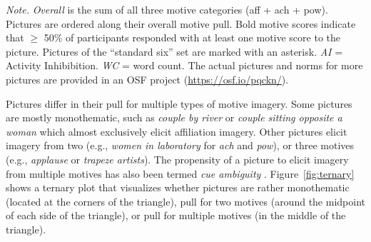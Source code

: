 \documentclass[man,a4paper,mask]{apa6}\usepackage[]{graphicx}\usepackage[]{color}
\begin{document}
\begin{table}
\begin{threeparttable}
\begin{tabularx}{\textwidth}{rlllllllr}
		
		\bottomrule
		\end{tabularx}
		\begin{tablenotes}[para,flushleft]
			{\small
			\vspace*{0.75em}
			\textit{Note.} \emph{Overall} is the sum of all three motive categories (aff + ach + pow). Pictures are ordered along their overall motive pull. Bold motive scores indicate that $\geq$ 50\% of participants responded with at least one motive score to the picture. Pictures of the ``standard six'' set are marked with an asterisk.  \emph{AI} = Activity Inhibibition. \emph{WC} = word count. The actual pictures and norms for more pictures are provided in an OSF project (\url{https://osf.io/pqckn/}).}
	      \end{tablenotes}
	  \end{threeparttable}
\end{table}


Pictures differ in their pull for multiple types of motive imagery. Some pictures are mostly monothematic, such as \emph{couple by river} or \emph{couple sitting opposite a woman} which almost exclusively elicit affiliation imagery. Other pictures elicit imagery from two (e.g., \emph{women in laboratory} for \emph{ach} and \emph{pow}), or three motives (e.g., \emph{applause} or \emph{trapeze artists}). The propensity of a picture to elicit imagery from multiple motives has also been termed \emph{cue ambiguity} \parencite{pang_ContentCodingMethods_2010,smith_MethodologicalConsiderationsSteps_1992,jacobs_MethodInvestigatingCue_1958}.
Figure~\ref{fig:ternary} shows a ternary plot \parencite{hamiltonGgternExtensionGgplot22017} that visualizes whether pictures are rather monothematic (located at the corners of the triangle), pull for two motives (around the midpoint of each side of the triangle), or pull for multiple motives (in the middle of the triangle).
\end{document}
